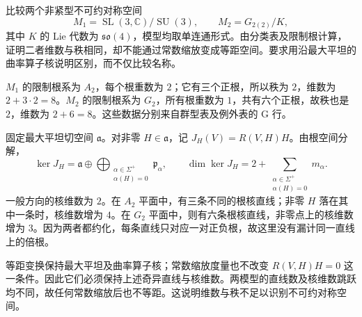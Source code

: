 \begin{optionalexercise}\label{g3:ex:same-rank-dimension-distinct-symmetric}
	比较两个非紧型不可约对称空间
	\[
		M_1=\operatorname{SL}(3,\mathbb C)/\operatorname{SU}(3),\qquad
		M_2=G_{2(2)}/K,
	\]
	其中 \(K\) 的 Lie 代数为 \(\mathfrak{so}(4)\)，模型均取单连通形式。由分类表及限制根计算，证明二者维数与秩相同，却不能通过常数缩放变成等距空间。要求用沿最大平坦的曲率算子核说明区别，而不仅比较名称。
\end{optionalexercise}
\begin{solution}
	\(M_1\) 的限制根系为 \(A_2\)，每个根重数为 \(2\)；它有三个正根，所以秩为 \(2\)，维数为 \(2+3\cdot2=8\)。\(M_2\) 的限制根系为 \(G_2\)，所有根重数为 \(1\)，共有六个正根，故秩也是 \(2\)，维数为 \(2+6=8\)。这些数据分别来自群型表及例外表的 G 行。

	固定最大平坦切空间 \(\mathfrak a\)。对非零 \(H\in\mathfrak a\)，记 \(J_H(V)=R(V,H)H\)。由根空间分解，
	\[
		\ker J_H=\mathfrak a\oplus
		\bigoplus_{\substack{\alpha\in\Sigma^+\\\alpha(H)=0}}\mathfrak p_\alpha,
	\qquad
		\dim\ker J_H=2+\sum_{\substack{\alpha\in\Sigma^+\\\alpha(H)=0}}m_\alpha.
	\]
	一般方向的核维数为 \(2\)。在 \(A_2\) 平面中，有三条不同的根核直线；非零 \(H\) 落在其中一条时，核维数增为 \(4\)。在 \(G_2\) 平面中，则有六条根核直线，非零点上的核维数增为 \(3\)。因为两者都约化，每条直线只对应一对正负根，故这里没有漏计同一直线上的倍根。

	等距变换保持最大平坦及曲率算子核；常数缩放度量也不改变 \(R(V,H)H=0\) 这一条件。因此它们必须保持上述奇异直线与核维数。两模型的直线数及核维数跳跃均不同，故任何常数缩放后也不等距。这说明维数与秩不足以识别不可约对称空间。
\end{solution}
